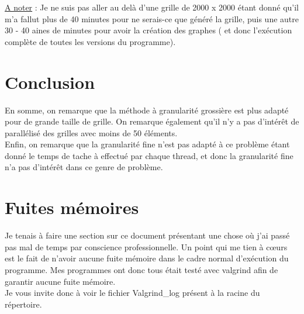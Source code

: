 \documentclass[10pt,a4paper]{article}
\begin{document}
\underline{A noter} : Je ne suis pas aller au delà d'une grille de 2000 x 2000 étant donné qu'il m'a fallut plus de 40 minutes pour ne serais-ce que généré la grille, puis une autre 30 - 40 aines de minutes pour avoir la création des graphes ( et donc l'exécution complète de toutes les versions du programme).

\section{Conclusion}

En somme, on remarque que la méthode à granularité grossière est plus adapté pour de grande taille de grille. On remarque également qu'il n'y a pas d'intérêt de parallélisé des grilles avec moins de 50 éléments. \\

Enfin, on remarque que la granularité fine n'est pas adapté à ce problème étant donné le temps de tache à effectué par chaque thread, et donc la granularité fine n'a pas d'intérêt dans ce genre de problème.

\section{Fuites mémoires}
Je tenais à faire une section sur ce document présentant une chose où j'ai passé pas mal de temps par conscience professionnelle. Un point qui me tien à cœurs est le fait de n'avoir aucune fuite mémoire dans le cadre normal d'exécution du programme. Mes programmes ont donc tous était testé avec valgrind afin de garantir aucune fuite mémoire.\\

Je vous invite donc à voir le fichier Valgrind\_log présent à la racine du répertoire.
\end{document}
